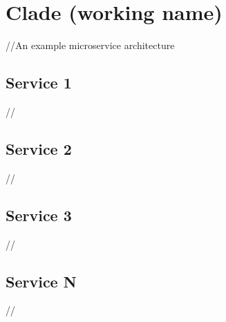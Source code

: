 

\section{Clade (working name)}
//An example microservice architecture

\subsection{Service 1}
//

\subsection{Service 2}
//

\subsection{Service 3}
//

\subsection{Service N}
//


